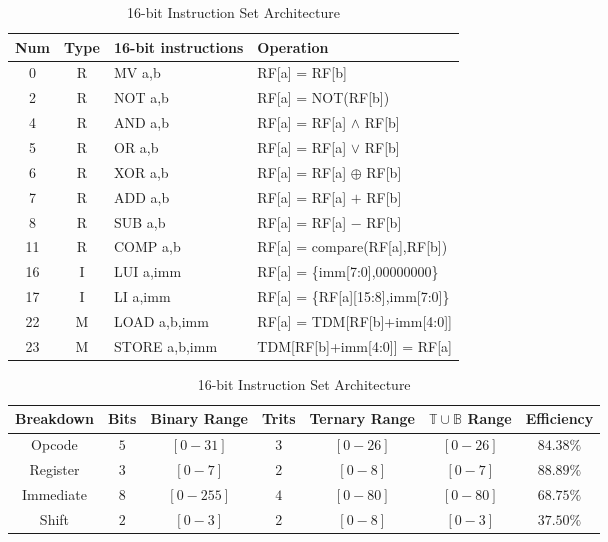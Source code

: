 \documentclass[12pt]{article}
\begin{document}
\begin{table}[h]
    \begin{tabular}{|c|c|l|l|}
    \hline
    Num & Type & 16-bit instructions & Operation \\
    \hline
    0 & R & MV a,b & RF[a] = RF[b] \\
    2 & R & NOT a,b & RF[a] = NOT(RF[b]) \\
    4 & R & AND a,b & RF[a] = RF[a] $\wedge$ RF[b] \\
    5 & R & OR a,b & RF[a] = RF[a] $\vee$ RF[b] \\
    6 & R & XOR a,b & RF[a] = RF[a] $\oplus$ RF[b] \\
    7 & R & ADD a,b & RF[a] = RF[a] $+$ RF[b] \\
    8 & R & SUB a,b & RF[a] = RF[a] $-$ RF[b] \\
    11 & R & COMP a,b & RF[a] = compare(RF[a],RF[b]) \\
    16 & I & LUI a,imm & RF[a] = \{imm[7:0],00000000\} \\
    17 & I & LI a,imm & RF[a] = \{RF[a][15:8],imm[7:0]\} \\
    22 & M & LOAD a,b,imm & RF[a] = TDM[RF[b]+imm[4:0]] \\
    23 & M & STORE a,b,imm & TDM[RF[b]+imm[4:0]] = RF[a] \\
    \hline
    \end{tabular}
    \caption{16-bit Instruction Set Architecture}
\end{table}

\begin{table}[h]
    \begin{tabular}{|c|c|c|c|c|c|c|}
    \hline
    Breakdown & Bits & Binary Range & Trits & Ternary Range & $\mathbb{T} \cup \mathbb{B}$ Range & Efficiency \\
    \hline
    Opcode & $5$ & $[0-31]$ & $3$ & $[0-26]$ & $[0-26]$ & $84.38\%$ \\
    Register & $3$ & $[0-7]$ & $2$ & $[0-8]$ & $[0-7]$ & $88.89\%$ \\
    Immediate & $8$ & $[0-255]$ & $4$ & $[0-80]$ & $[0-80]$ & $68.75\%$ \\
    Shift & $2$ & $[0-3]$ & $2$ & $[0-8]$ & $[0-3]$ & $37.50\%$ \\
    \hline
    \end{tabular}
    \caption{16-bit Instruction Set Architecture}
\end{table}

\newpage



\end{document}

